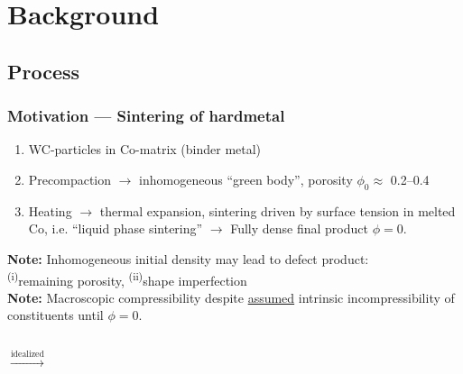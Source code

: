 \documentclass[11pt]{beamer} %
\renewcommand{\alert}[1]{\textbf{#1}}
\begin{document}
\section{Background}
\subsection{Process}
\begin{frame}
 \frametitle{Motivation --- Sintering of hardmetal}


 \begin{enumerate}
  \item WC-particles in Co-matrix (binder metal)
  \item Precompaction $\rightarrow$ inhomogeneous ``green body'', porosity $\phi_0\approx$ 0.2--0.4
  \item Heating $\rightarrow$ thermal expansion, sintering driven by surface tension in melted Co, i.e. ``liquid phase sintering'' $\rightarrow$
        Fully dense final product $\phi=0$.
 \end{enumerate}
\alert{Note:} Inhomogeneous initial density may lead to defect product:\\ \textsuperscript{(i)}remaining porosity, \textsuperscript{(ii)}shape imperfection\\
\alert{Note:} Macroscopic compressibility despite \underline{assumed} intrinsic incompressibility of constituents until $\phi = 0$.
\begin{center}
 \begin{columns}
 \centering
 \centering
 $\xrightarrow{\text{idealized}}$
 \centering
 \end{columns}
\end{center}
\end{frame}
\end{document}
